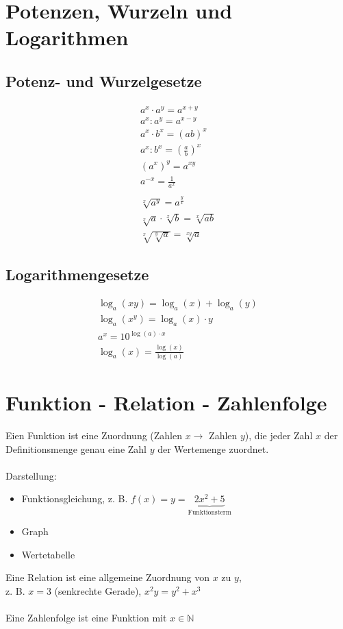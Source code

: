 \section{Potenzen, Wurzeln und Logarithmen}

\subsection{Potenz- und Wurzelgesetze}
\begin{gather*}
  a^x \cdot a^y = a^{x + y} \\
  a^x : a^y = a^{x - y} \\
  a^x \cdot b^x = (ab)^x \\
  a^x : b^x = (\frac{a}{b})^x \\
  (a^x)^y = a^{xy} \\
  a^{-x} = \frac{1}{a^x} \\\\
  \sqrt[x]{a^y} = a^\frac{y}{x} \\
  \sqrt[x]{a} \cdot \sqrt[x]{b} = \sqrt[x]{ab} \\
  \sqrt[x]{\sqrt[y]{a}} = \sqrt[xy]{a}
\end{gather*}

\subsection{Logarithmengesetze}
\begin{gather*}
  \log_a(xy) = \log_a(x) + \log_a(y) \\
  \log_a(x^y) = \log_a(x) \cdot y \\
  a^x = 10^{\log(a) \cdot x} \\
  \log_a(x) = \frac{\log(x)}{\log(a)}
\end{gather*}

\section{Funktion - Relation - Zahlenfolge}
Eien Funktion ist eine Zuordnung (Zahlen $x \rightarrow$ Zahlen $y$), die jeder Zahl $x$ der Definitionsmenge genau eine Zahl $y$ der Wertemenge zuordnet. \\\\
Darstellung:
\begin{itemize}
  \item Funktionsgleichung, z. B. $f(x) = y = \underbrace{2x^2 + 5}_\text{Funktionsterm}$
  \item Graph
  \item Wertetabelle
\end{itemize}
Eine Relation ist eine allgemeine Zuordnung von $x$ zu $y$,\\
z. B. $x = 3$ (senkrechte Gerade), $x^2y = y^2 + x^3$ \\\\
Eine Zahlenfolge ist eine Funktion mit $x \in \mathbb{N}$

